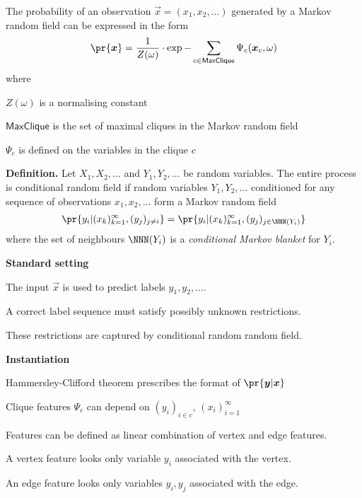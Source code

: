 \documentclass[landscape,footrule]{foils}
\begin{document}

The probability of an observation $\vec{x}=(x_1,x_2,\ldots)$ generated by a Markov random field can be expressed in the form 
\begin{align*}
\pr{\vec{x}}=\frac{1}{Z(\omega)}\cdot\exp{-\sum_{c\in\textsf{MaxClique}}\Psi_c(\vec{x}_c,\omega)} 
\end{align*}  
where
\begin{triangles}
\item $Z(\omega)$ is a normalising constant
\item $\textsf{MaxClique}$ is the set of maximal cliques in the Markov random field
\item $\Psi_c$ is defined on the variables in the clique $c$ 
\end{triangles}




\textbf{Definition.}
Let $X_1,X_2,\ldots$ and $Y_1,Y_2,\ldots$ be random variables. The entire process is conditional random field if random variables $Y_1,Y_2,\ldots$ conditioned for any sequence of observations $x_1,x_2,\ldots$ form a Markov random field
\begin{align*}
\pr{y_i|(x_k)_{k=1}^\infty, (y_j)_{j\neq i}}=\pr{y_i|(x_k)_{k=1}^\infty, (y_j)_{j\in\NNN(Y_i)} }
\end{align*}
where the set of neighbours $\NNN(Y_i)$ is a \emph{conditional Markov blanket} for $Y_i$. 


\textbf{Standard setting}
\begin{triangles}
\item The input $\vec{x}$ is used to predict labels $y_1,y_2,\ldots$.
\item A correct label sequence must satisfy possibly unknown restrictions.
\item These restrictions are captured by conditional random random field.
\end{triangles}\vspace*{1cm}


\textbf{Instantiation}
\begin{triangles}
\item Hammersley-Clifford theorem prescribes the format of $\pr{\vec{y}|\vec{x}}$
\item Clique features $\Psi_c$ can depend on $(y_i)_{i\in c}$, $(x_i)_{i=1}^\infty$ 
\item Features can be defined as linear combination of vertex and edge features.
\item A vertex feature looks only variable $y_i$ associated with the vertex.
\item An edge feature looks only variables $y_i, y_j$ associated with the edge.
\end{triangles}
\end{document}
